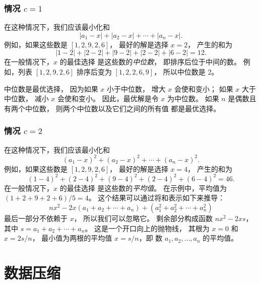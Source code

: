 \subsubsection{情况 $c=1$}

在这种情况下，我们应该最小化和
\[|a_1-x|+|a_2-x|+\cdots+|a_n-x|.\]
例如，如果这些数是 $[1,2,9,2,6]$，
最好的解是选择 $x=2$，
产生的和为
\[
|1-2|+|2-2|+|9-2|+|2-2|+|6-2|=12.
\]
在一般情况下，$x$ 的最佳选择
是这些数的\textit{中位数}，
即排序后位于中间的数。
例如，列表 $[1,2,9,2,6]$
排序后变为 $[1,2,2,6,9]$，
所以中位数是 2。

中位数是最优选择，
因为如果 $x$ 小于中位数，
增大 $x$ 会使和变小；
如果 $x$ 大于中位数，
减小 $x$ 会使和变小。
因此，最优解是令 $x$
为中位数。
如果 $n$ 是偶数且有两个中位数，
则两个中位数以及它们之间的所有值
都是最优选择。

\subsubsection{情况 $c=2$}

在这种情况下，我们应该最小化和
\[(a_1-x)^2+(a_2-x)^2+\cdots+(a_n-x)^2.\]
例如，如果这些数是 $[1,2,9,2,6]$，
最好的解是选择 $x=4$，
产生的和为
\[
(1-4)^2+(2-4)^2+(9-4)^2+(2-4)^2+(6-4)^2=46.
\]
在一般情况下，$x$ 的最佳选择
是这些数的\emph{平均值}。
在示例中，平均值为 $(1+2+9+2+6)/5=4$。
这个结果可以通过将和表示如下来推导：
\[
nx^2 - 2x(a_1+a_2+\cdots+a_n) + (a_1^2+a_2^2+\cdots+a_n^2)
\]
最后一部分不依赖于 $x$，
所以我们可以忽略它。
剩余部分构成函数
$nx^2-2xs$，其中 $s=a_1+a_2+\cdots+a_n$。
这是一个开口向上的抛物线，
其根为 $x=0$ 和 $x=2s/n$，
最小值为两根的平均值
$x=s/n$，即
数 $a_1,a_2,\ldots,a_n$ 的平均值。

\section{数据压缩}


